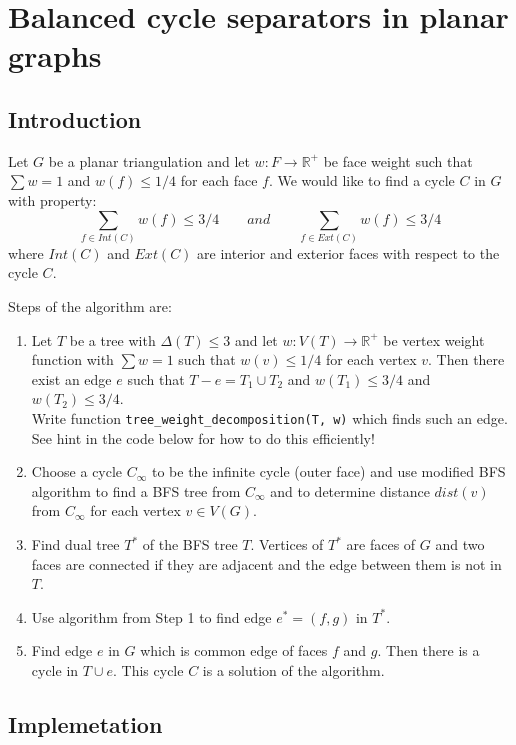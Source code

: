 \chapter{Balanced cycle separators in planar graphs}

\section{Introduction}

Let $G$ be a planar triangulation and let $w: F \to \mathbb{R}^+$ be face weight such that $\sum w = 1$ and $w(f) \leq 1/4$ for each face $f$. We would like to find a cycle $C$ in $G$ with property:
$$
\sum_{f \in Int(C)} w(f) \leq 3/4\qquad and \qquad \sum_{f\in Ext(C)} w(f) \leq 3/4
$$
where $Int(C)$ and $Ext(C)$ are interior and exterior faces with respect to the cycle $C$.

\medskip
\noindent Steps of the algorithm are:
\begin{enumerate}
\item Let $T$ be a tree with $\Delta(T) \leq 3$ and let $w: V(T) \to \mathbb{R}^+$ be vertex weight function with $\sum w = 1$ such that $w(v) \leq 1/4$ for each vertex $v$. Then there exist an edge $e$ such that $T - e = T_1 \cup T_2$ and $w(T_1) \leq 3/4$ and $w(T_2) \leq 3/4$. \\
Write function \verb`tree_weight_decomposition(T, w)` which finds such an edge. See hint in the code below for how to do this efficiently!

\item Choose a cycle $C_\infty$ to be the infinite cycle (outer face) and use modified BFS algorithm to find a BFS tree from $C_\infty$ and to determine distance $dist(v)$ from $C_\infty$ for each vertex $v \in V(G)$.

\item Find dual tree $T^*$ of the BFS tree $T$. Vertices of $T^*$ are faces of $G$ and two faces are connected if they are adjacent and the edge between them is not in $T$.

\item Use algorithm from Step 1 to find edge $e^* = (f, g)$ in $T^*$.

\item Find edge $e$ in $G$ which is common edge of faces $f$ and $g$. Then there is a cycle in $T \cup e$. This cycle $C$ is a solution of the algorithm.
\end{enumerate}

\section{Implemetation}

